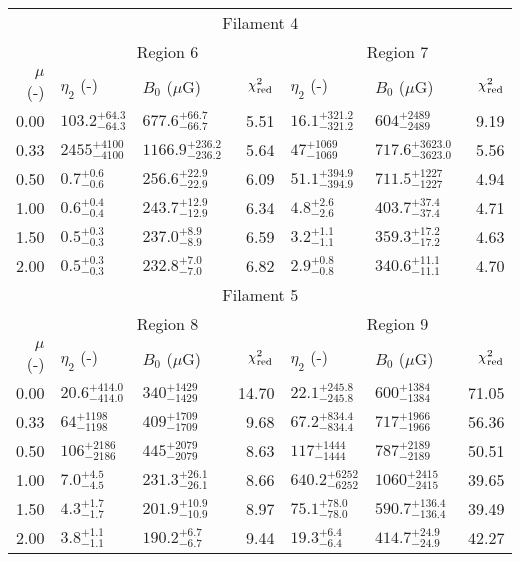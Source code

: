 \begin{tabular}{@{}rllr llr@{}}
\midrule
\multicolumn{7}{c}{Filament 4} \\
\cmidrule{1-7}
{} & \multicolumn{3}{c}{Region 6\tablenotemark{a}}
   & \multicolumn{3}{c}{Region 7} \\
\cmidrule(lr){2-4} \cmidrule(l){5-7}
$\mu$ (-) & $\eta_2$ (-) & $B_0$ ($\mu$G) & $\chi^2_{\mathrm{red}}$
          & $\eta_2$ (-) & $B_0$ ($\mu$G) & $\chi^2_{\mathrm{red}}$ \\
\cmidrule{1-7}

0.00 & ${103.2}^{+64.3}_{-64.3}$ & ${677.6}^{+66.7}_{-66.7}$ & 5.51
     & ${16.1}^{+321.2}_{-321.2}$ & ${604}^{+2489}_{-2489}$ & 9.19 \\
0.33 & ${2455}^{+4100}_{-4100}$ & ${1166.9}^{+236.2}_{-236.2}$ & 5.64
     & ${47}^{+1069}_{-1069}$ & ${717.6}^{+3623.0}_{-3623.0}$ & 5.56 \\
0.50 & ${0.7}^{+0.6}_{-0.6}$ & ${256.6}^{+22.9}_{-22.9}$ & 6.09
     & ${51.1}^{+394.9}_{-394.9}$ & ${711.5}^{+1227}_{-1227}$ & 4.94 \\
1.00 & ${0.6}^{+0.4}_{-0.4}$ & ${243.7}^{+12.9}_{-12.9}$ & 6.34
     & ${4.8}^{+2.6}_{-2.6}$ & ${403.7}^{+37.4}_{-37.4}$ & 4.71 \\
1.50 & ${0.5}^{+0.3}_{-0.3}$ & ${237.0}^{+8.9}_{-8.9}$ & 6.59
     & ${3.2}^{+1.1}_{-1.1}$ & ${359.3}^{+17.2}_{-17.2}$ & 4.63 \\
2.00 & ${0.5}^{+0.3}_{-0.3}$ & ${232.8}^{+7.0}_{-7.0}$ & 6.82
     & ${2.9}^{+0.8}_{-0.8}$ & ${340.6}^{+11.1}_{-11.1}$ & 4.70 \\

\midrule
\multicolumn{7}{c}{Filament 5} \\
\cmidrule{1-7}
{} & \multicolumn{3}{c}{Region 8\tablenotemark{a}}
   & \multicolumn{3}{c}{Region 9} \\
\cmidrule(lr){2-4} \cmidrule(l){5-7}
$\mu$ (-) & $\eta_2$ (-) & $B_0$ ($\mu$G) & $\chi^2_{\mathrm{red}}$
          & $\eta_2$ (-) & $B_0$ ($\mu$G) & $\chi^2_{\mathrm{red}}$ \\
\cmidrule{1-7}

0.00 & ${20.6}^{+414.0}_{-414.0}$ & ${340}^{+1429}_{-1429}$ & 14.70
     & ${22.1}^{+245.8}_{-245.8}$ & ${600}^{+1384}_{-1384}$ & 71.05 \\
0.33 & ${64}^{+1198}_{-1198}$ & ${409}^{+1709}_{-1709}$ & 9.68
     & ${67.2}^{+834.4}_{-834.4}$ & ${717}^{+1966}_{-1966}$ & 56.36 \\
0.50 & ${106}^{+2186}_{-2186}$ & ${445}^{+2079}_{-2079}$ & 8.63
     & ${117}^{+1444}_{-1444}$ & ${787}^{+2189}_{-2189}$ & 50.51 \\
1.00 & ${7.0}^{+4.5}_{-4.5}$ & ${231.3}^{+26.1}_{-26.1}$ & 8.66
     & ${640.2}^{+6252}_{-6252}$ & ${1060}^{+2415}_{-2415}$ & 39.65 \\
1.50 & ${4.3}^{+1.7}_{-1.7}$ & ${201.9}^{+10.9}_{-10.9}$ & 8.97
     & ${75.1}^{+78.0}_{-78.0}$ & ${590.7}^{+136.4}_{-136.4}$ & 39.49 \\
2.00 & ${3.8}^{+1.1}_{-1.1}$ & ${190.2}^{+6.7}_{-6.7}$ & 9.44
     & ${19.3}^{+6.4}_{-6.4}$ & ${414.7}^{+24.9}_{-24.9}$ & 42.27 \\

\bottomrule
\end{tabular}
